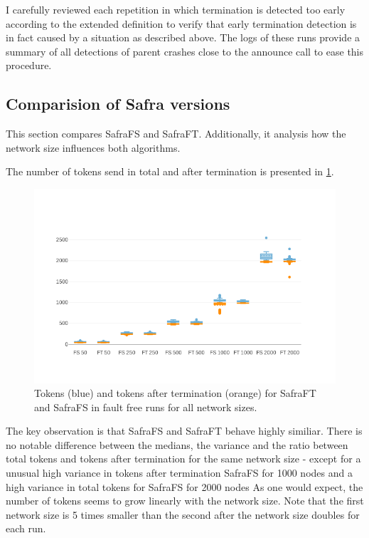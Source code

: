 I carefully reviewed each repetition in which termination is detected too early according to the extended definition to verify that early termination detection is in fact caused by a situation as described above.
The logs of these runs provide a summary of all detections of parent crashes close to the announce call to ease this procedure.

\subsection{Comparision of Safra versions}
This section compares SafraFS and SafraFT. 
Additionally, it analysis how the network size influences both algorithms.

The number of tokens send in total and after termination is presented in \cref{fig:tokens-and-tokens-after}.


\begin{figure}
	\includegraphics{figures/tokens-and-tokens-after.png}
	\caption{Tokens (blue) and tokens after termination (orange) for SafraFT and SafraFS in fault free runs for all network sizes.}
	\label{fig:tokens-and-tokens-after}
\end{figure}

The key observation is that SafraFS and SafraFT behave highly similiar.
There is no notable difference between the medians, the variance and the ratio between total tokens and tokens after termination for the same network size - except for a unusual high variance in tokens after termination SafraFS for 1000 nodes and a high variance in total tokens for SafraFS for 2000 nodes %
As one would expect, the number of tokens seems to grow linearly with the network size.
Note that the first network size is 5 times smaller than the second after the network size doubles for each run.

